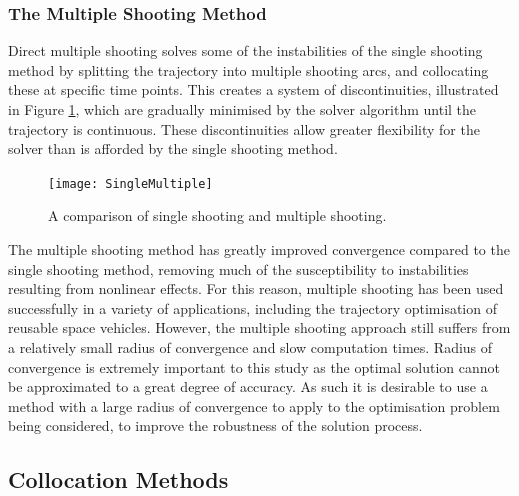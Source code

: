 \subsubsection{The Multiple Shooting Method}

Direct multiple shooting solves some of the instabilities of the single shooting method by splitting the trajectory into multiple shooting arcs, and collocating these at specific time points\cite{Betts1998,Kelly2015,Rao2009,Fasano2013}. This creates a system of discontinuities, illustrated in Figure \ref{fig:multipleshooting}, which are gradually minimised by the solver algorithm until the trajectory is continuous. These discontinuities allow greater flexibility for the solver than is afforded by the single shooting method. 

\begin{figure}[ht]
	\centering
	\texttt{[image: SingleMultiple]}
	\caption{A comparison of single shooting and multiple shooting\cite{Kelly2015}.}
	\label{fig:multipleshooting}
\end{figure}

The multiple shooting method has greatly improved convergence compared to the single shooting method, removing much of the susceptibility to instabilities resulting from nonlinear effects. For this reason, multiple shooting has been used successfully in a variety of applications, including the trajectory optimisation of reusable space vehicles\cite{Maddock2018}. However, the multiple shooting approach still suffers from a relatively small radius of convergence and slow computation times\cite{Fasano2013}. Radius of convergence is extremely important to this study as the optimal solution cannot be approximated to a great degree of accuracy. As such it is desirable to use a method with a large radius of convergence to apply to the optimisation problem being considered, to improve the robustness of the solution process.

\subsection{Collocation Methods}

